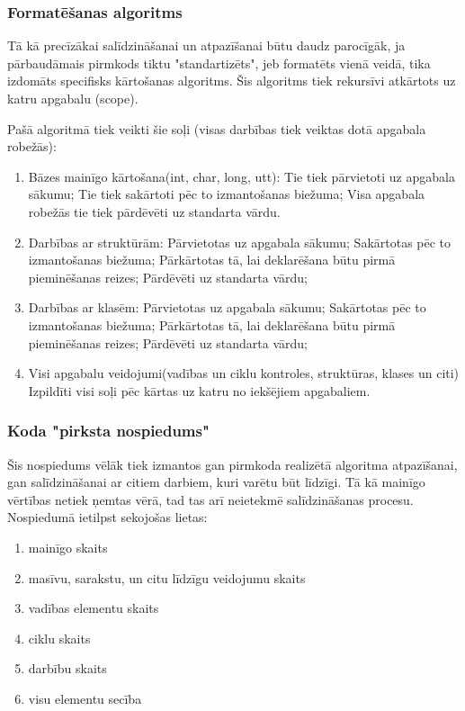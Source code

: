 \subsubsection{Formatēšanas algoritms}
Tā kā precīzākai salīdzināšanai un atpazīšanai būtu daudz parocīgāk, ja pārbaudāmais pirmkods tiktu "standartizēts", jeb formatēts vienā veidā, tika izdomāts specifisks kārtošanas algoritms. Šis algoritms tiek rekursīvi atkārtots uz katru apgabalu (scope).

Pašā algoritmā tiek veikti šie soļi (visas darbības tiek veiktas dotā apgabala robežās):
\begin{enumerate}
\item Bāzes mainīgo kārtošana(int, char, long, utt):
\subitem Tie tiek pārvietoti uz apgabala sākumu;
\subitem Tie tiek sakārtoti pēc to izmantošanas biežuma;
\subitem Visa apgabala robežās tie tiek pārdēvēti uz standarta vārdu.
\item Darbības ar struktūrām:
\subitem Pārvietotas uz apgabala sākumu;
\subitem Sakārtotas pēc to izmantošanas biežuma;
\subitem Pārkārtotas tā, lai deklarēšana būtu pirmā pieminēšanas reizes;
\subitem Pārdēvēti uz standarta vārdu;
\item Darbības ar klasēm:
\subitem Pārvietotas uz apgabala sākumu;
\subitem Sakārtotas pēc to izmantošanas biežuma;
\subitem Pārkārtotas tā, lai deklarēšana būtu pirmā pieminēšanas reizes;
\subitem Pārdēvēti uz standarta vārdu;
\item Visi apgabalu veidojumi(vadības un ciklu kontroles, struktūras, klases un citi)
\subitem Izpildīti visi soļi pēc kārtas uz katru no iekšējiem apgabaliem.
\end{enumerate}

\subsubsection{Koda "pirksta nospiedums"}
Šis nospiedums vēlāk tiek izmantos gan pirmkoda realizētā algoritma atpazīšanai, gan salīdzināšanai ar citiem darbiem, kuri varētu būt līdzīgi. Tā kā mainīgo vērtības netiek ņemtas vērā, tad tas arī neietekmē salīdzināšanas procesu. 
Nospiedumā ietilpst sekojošas lietas:
\begin{enumerate}
\item mainīgo skaits
\item masīvu, sarakstu, un citu līdzīgu veidojumu skaits
\item vadības elementu skaits
\item ciklu skaits
\item darbību skaits
\item visu elementu secība
\end{enumerate}

